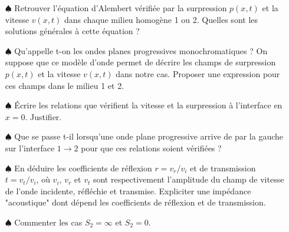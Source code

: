 \documentclass{report}
\begin{document}
\begin{itemize}
	
	\item[$\spadesuit$] Retrouver l'équation d'Alembert vérifiée par la surpression $p(x,t)$ et la vitesse $v(x,t)$ dans chaque milieu homogène 1 ou 2. Quelles sont les solutions générales à cette équation ? 

	\item[$\spadesuit$] Qu'appelle t-on les ondes planes progressives monochromatiques ? On suppose que ce modèle d'onde permet de décrire les champs de surpression $p(x,t)$ et la vitesse $v(x,t)$ dans notre cas. Proposer une expression pour ces champs dans le milieu 1 et 2.
	
	\item[$\spadesuit$] Écrire les relations que vérifient la vitesse et la surpression à l'interface en $x=0$. Justifier.
	
	\item[$\spadesuit$] Que se passe t-il lorsqu'une onde plane progressive arrive de par la gauche sur l'interface $1\longrightarrow2$ pour que ces relations soient vérifiées ?
	
	\item[$\spadesuit$] En déduire les coefficients de réflexion $r=v_r/v_i$ et de transmission $t=v_t/v_i$, où $v_i$, $v_r$ et $v_t$ sont respectivement l'amplitude du champ de vitesse de l'onde incidente, réfléchie et transmise. Expliciter une impédance "acoustique" dont dépend les coefficients de réflexion et de transmission.
	
	\item[$\spadesuit$] Commenter les cas $S_2=\infty$ et $S_2=0$.

\end{itemize}
\end{document}

